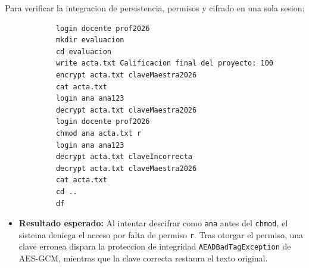 \documentclass[11pt,a4paper]{article}
\begin{document}
	Para verificar la integracion de persistencia, permisos y cifrado en una sola sesion:
	
	\begin{consolebox}
		\begin{verbatim}
			login docente prof2026
			mkdir evaluacion
			cd evaluacion
			write acta.txt Calificacion final del proyecto: 100
			encrypt acta.txt claveMaestra2026
			cat acta.txt
			login ana ana123
			decrypt acta.txt claveMaestra2026
			login docente prof2026
			chmod ana acta.txt r
			login ana ana123
			decrypt acta.txt claveIncorrecta
			decrypt acta.txt claveMaestra2026
			cat acta.txt
			cd ..
			df
		\end{verbatim}
	\end{consolebox}
	
	\begin{itemize}
		\item \textbf{Resultado esperado:} Al intentar descifrar como \texttt{ana} antes del \texttt{chmod}, el sistema deniega el acceso por falta de permiso \texttt{r}. Tras otorgar el permiso, una clave erronea dispara la proteccion de integridad \texttt{AEADBadTagException} de AES-GCM, mientras que la clave correcta restaura el texto original.
	\end{itemize}
	
\end{document}

